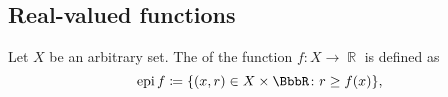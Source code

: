 \subsection{Real-valued functions}\label{subsec:real_valued_functions}

\begin{definition}\label{def:epigraph}
  Let \( X \) be an arbitrary set. The  of the function \( f: X \to \BbbR \) is defined as
  \begin{equation*}
    \Epi f \coloneqq \{ (x, r) \in X \times \BbbR \colon r \geq f(x) \},
  \end{equation*}
\end{definition}
